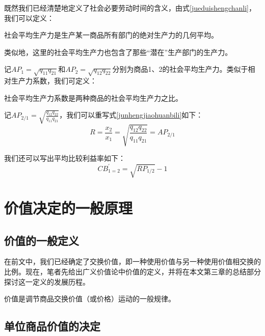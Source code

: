 既然我们已经清楚地定义了社会必要劳动时间的含义，由式\ref{jueduishengchanli}，我们可以定义：
\begin{definition}
    社会平均生产力是生产某一商品所有部门的绝对生产力的几何平均。
\end{definition}

类似地，这里的社会平均生产力也包含了那些“潜在”生产部门的生产力。

记$\mathit{AP}_1 = \sqrt{q_{11}q_{21}}$和$\mathit{AP}_2 = \sqrt{q_{12}q_{22}}$分别为商品1、2的社会平均生产力。类似于相对生产力系数，我们可定义：
\begin{definition}
    社会平均生产力系数是两种商品的社会平均生产力之比\cite[68]{CaiJiMingCongXiaYiJieZhiLunDaoGuangYiJieZhiLunXiuDingBan2022}。
\end{definition}

记$\mathit{AP}_{2/1} = \sqrt{\frac{q_{12}q_{22}}{q_{11}q_{21}}}$，我们可以重写式\ref{junhengjiaohuanbili}如下\cite[68]{CaiJiMingCongXiaYiJieZhiLunDaoGuangYiJieZhiLunXiuDingBan2022}：
\begin{equation}
    \mathit{R} = \frac{x_2}{x_1} = \sqrt{\frac{q_{12}q_{22}}{q_{11}q_{21}}} = \mathit{AP}_{2/1}
\end{equation}

我们还可以写出平均比较利益率如下：
\begin{equation}
    \mathit{CB}^{\prime}_{1=2} = \sqrt{\mathit{RP}_{1/2}} - 1
\end{equation}

\section{价值决定的一般原理}

\subsection{价值的一般定义}

在前文中，我们已经确定了交换价值，即一种使用价值与另一种使用价值相交换的比例。现在，笔者先给出广义价值论中价值的定义，并将在本文第三章的总结部分探讨这一定义的发展历程。

\begin{definition}
    价值是调节商品交换价值（或价格）运动的一般规律\cite[6]{CaiJiMingCongXiaYiJieZhiLunDaoGuangYiJieZhiLunXiuDingBan2022}。
\end{definition}

\subsection{单位商品价值的决定}

